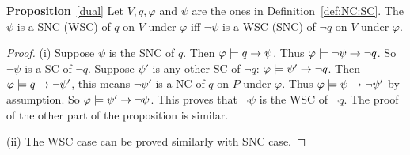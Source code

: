 \documentclass{article}
\begin{document}
\textbf{Proposition}~\ref{dual} Let $V,q,\varphi$ and $\psi$ are the ones in Definition~\ref{def:NC:SC}.
 The $\psi$ is a SNC (WSC) of $q$ on $V$ under $\varphi$ iff $\neg \psi$ is a WSC (SNC)
    of $\neg q$ on $V$ under $\varphi$.\\
\begin{proof}
     (i) Suppose $\psi$ is the SNC of $q$. Then $\varphi \models q \rightarrow \psi$. Thus $\varphi \models \neg \psi \rightarrow \neg q$. So $\neg \psi$ is a
SC of $\neg q$. Suppose $\psi'$ is any other SC of $\neg q$: $\varphi \models \psi' \rightarrow \neg q$. Then $\varphi \models q \rightarrow \neg \psi'$, this means $\neg \psi'$ is a NC of $q$ on $P$ under $\varphi$.
Thus $\varphi \models \psi \rightarrow \neg \psi'$ by assumption. So $\varphi \models \psi' \rightarrow \neg \psi$. This proves that $\neg \psi$ is the WSC of $\neg q$.
The proof of the other part of the proposition is similar.

(ii) The WSC case can be proved similarly with SNC case.
    \end{proof}
\end{document}
